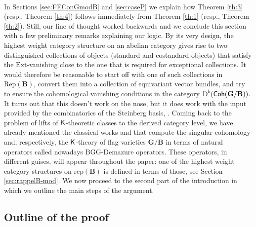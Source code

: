 \documentclass[sn-mathphys-num]{sn-jnl}%
\newcommand{\rep}{{\mathrm{rep}}}
\newcommand{\Ext}{{\mathrm{Ext}}}
\newcommand{\Rep}{{\mathrm{Rep}}}
\newcommand*{\Dd}{\mathop{\mathrm D\kern0pt}\nolimits}
\newcommand*{\Coh}{\mathop{\sf {Coh}}\nolimits}
\newcommand{\bg}{\mathbf G}
\newcommand{\fb}{\mathbf B}
\theoremstyle{definition}
\begin{document}
\

In Sections \ref{sec:FEConGmodB} and \ref{sec:caseP} we explain how Theorem \ref{th:3} (resp., Theorem \ref{th:4}) follows immediately from Theorem \ref{th:1} (resp., Theorem \ref{th:2}). Still, our line of thought worked backwards and we conclude this section with a few preliminary remarks explaining our logic. By its very design, the highest weight category structure on an abelian category gives rise to two distinguished collections of objects (standard and costandard objects) that satisfy the $\Ext$-vanishing close to the one that is required for exceptional collections. 
It would therefore be reasonable to start off with one of such collections in $\Rep(\fb)$, convert them into a collection of equivariant vector bundles, and try to ensure the cohomological vanishing conditions in the category $\Dd ^b(\Coh({\bg}/{\fb}))$. 
It turns out that this doesn't work on the nose, but it does work with the input provided by the combinatorics of the Steinberg basis, \cite{St}. Coming back to the problem of lifts of $\sf K$-theoretic classes to the derived category level, we have already mentioned the classical works \cite{BGG} and \cite{Dem} that compute the singular cohomology and, respectively, the $\sf K$-theory of flag varieties $\bg/\fb$ in terms of natural operators called nowadays BGG-Demazure operators. These operators, in different guises, will appear throughout the paper: one of the highest weight category structures on $\rep( \fb)$ is defined in terms of those, see Section \ref{sec:rappelB-mod}. 
We now proceed to the second part of the introduction in which we outline the main steps of the argument.

\subsection{Outline of the proof}
\end{document}
